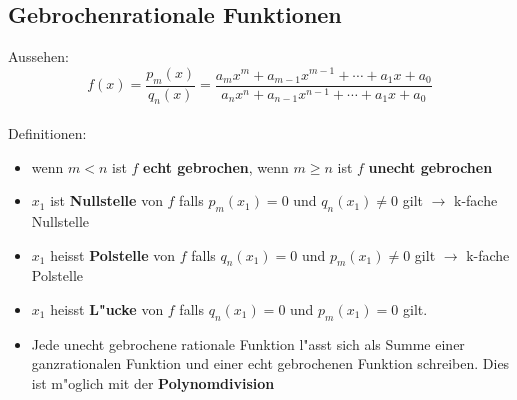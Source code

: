 \begin{flushleft}
		\subsection{Gebrochenrationale Funktionen}
			Aussehen: \[f(x)=\frac{p_m(x)}{q_n(x)}=\frac{a_mx^{m}+a_{m-1}x^{m-1}+\cdots+a_1x+a_0}{a_nx^{n}+a_{n-1}x^{n-1}+\cdots+a_1x+a_0}\]\\
			Definitionen:\\
			\begin{itemize}
				\item wenn $m<n$ ist $f$ \textbf{echt gebrochen}, wenn $m\geq n$ ist $f$ \textbf{unecht gebrochen}\\
				\item $x_1$ ist \textbf{Nullstelle} von $f$ falls $p_m(x_1)=0$ und $q_n(x_1)\neq0$ gilt $\rightarrow$ k-fache Nullstelle\\
				\item $x_1$ heisst \textbf{Polstelle} von $f$ falls $q_n(x_1)=0$ und $p_m(x_1)\neq0$ gilt $\rightarrow$ k-fache Polstelle\\
				\item $x_1$ heisst \textbf{L"ucke} von $f$ falls $q_n(x_1)=0$ und $p_m(x_1)=0$ gilt.\\
				\item Jede unecht gebrochene rationale Funktion l"asst sich als Summe einer ganzrationalen Funktion und einer echt gebrochenen Funktion
							schreiben. Dies ist m"oglich mit der \textbf{Polynomdivision}
			\end{itemize}			
			

\end{flushleft}
